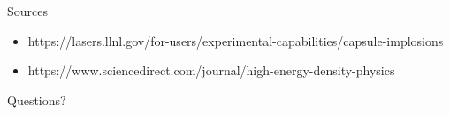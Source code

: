 \documentclass{beamer}
\begin{document}
\begin{frame} {Sources}
    \begin{itemize}
        \item https://lasers.llnl.gov/for-users/experimental-capabilities/capsule-implosions
        \item https://www.sciencedirect.com/journal/high-energy-density-physics
    \end{itemize}
    
    
\end{frame}


\begin{frame}
    \centering
    Questions? 

\end{frame}
\end{document}

